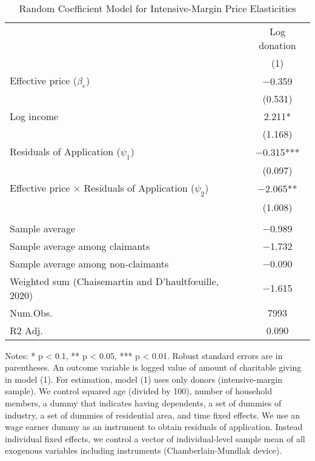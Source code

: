 \begin{table}

\caption{Random Coefficient Model for Intensive-Margin Price Elasticities\label{tab:random-coefficient}}
\centering
\fontsize{8}{10}\selectfont
\begin{threeparttable}
\begin{tabular}[t]{lc}
\toprule
\multicolumn{1}{c}{ } & \multicolumn{1}{c}{Log donation} \\
\cmidrule(l{3pt}r{3pt}){2-2}
  & (1)\\
\midrule
Effective price ($\beta_e$) & \num{-0.359}\\
 & (\num{0.531})\\
Log income & \num{2.211}*\\
 & (\num{1.168})\\
Residuals of Application ($\psi_1$) & \num{-0.315}***\\
 & (\num{0.097})\\
Effective price $\times$ Residuals of Application ($\psi_2$) & \num{-2.065}**\\
 & (\num{1.008})\\
\midrule
\addlinespace[0.3em]
\multicolumn{2}{l}{\textit{Aggregated price elasticity}}\\
\hspace{1em}Sample average & \num{-0.989}\\
\hspace{1em}Sample average among claimants & \num{-1.732}\\
\hspace{1em}Sample average among non-claimants & \num{-0.090}\\
\hspace{1em}Weighted sum (Chaisemartin and D'haultf\oe uille, 2020) & \num{-1.615}\\
Num.Obs. & \num{7993}\\
R2 Adj. & \num{0.090}\\
\bottomrule
\end{tabular}
\begin{tablenotes}
\item Notes: * p < 0.1, ** p < 0.05, *** p < 0.01. Robust standard errors are in parentheses. An outcome variable is logged value of amount of charitable giving in model (1). For estimation, model (1) uses only donors (intensive-margin sample). We control squared age (divided by 100), number of household members, a dummy that indicates having dependents, a set of dummies of industry, a set of dummies of residential area, and time fixed effects. We use an wage earner dummy as an instrument to obtain residuals of application. Instead individual fixed effects, we control a vector of individual-level sample mean of all exogenous variables including instruments (Chamberlain-Mundlak device).
\end{tablenotes}
\end{threeparttable}
\end{table}
